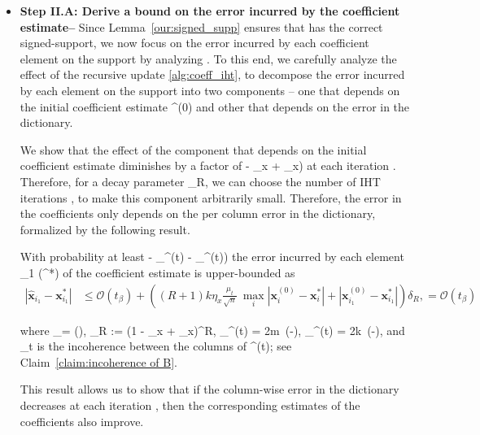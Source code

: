 \documentclass{article}
\newcommand{\HT}{{\c{T}}}
\newcommand{\supp}{{\rm supp}}
\def\[#1\]{{$#1$}}
\def\b#1{{\mathbf{#1}}}
\def\c#1{{\mathcal{#1}}}
\begin{document}
\begin{itemize}
\item\textbf{Step II.A: Derive a bound on the error incurred by the coefficient estimate-- }\label{Step II.A}
Since Lemma~\ref{our:signed_supp} ensures that \[\hat{\b{x}}\] has the correct signed-support, we now focus on the error incurred by each coefficient element on the support by analyzing \[\hat{\b{x}}\]. To this end, we carefully analyze the effect of the recursive update \eqref{alg:coeff_iht}, to decompose the error incurred by each element on the support into two components -- one  that depends on the initial coefficient estimate \[\b{x}^{(0)}\] and other that depends on the error in the dictionary. 

We show that the effect of the component that depends on the initial coefficient estimate diminishes by a factor of \[(1 - \eta_{x} + \eta_x)\] at each iteration \[r\]. Therefore, for a decay parameter \[\delta_R\], we can choose the number of IHT iterations \[R\], to make this component arbitrarily small. Therefore, the error in the coefficients only depends on the per column error in the dictionary, formalized by the following result.

 \begin{lemma}\label{iht:x_R_error}
 	With probability at least \[(1 - \delta_{\beta}^{(t)} - \delta_{\HT}^{(t)})\] the error incurred by each element \[i_1 \in \supp(\b{x}^*)\] of the coefficient estimate is upper-bounded as
 	\begin{align*}
 	
 	
 	|\hat{\b{x}}_{i_1} - \b{x}_{i_1}^*|
 
 	&\leq    \mathcal{O}(t_\beta) + \left({(R + 1)}k \eta_x\tfrac{\mu_t}{\sqrt{n}}~\underset{i}{\max}|\b{x}_{i}^{(0)} - \b{x}_{i}^*| + |\b{x}_{i_1}^{(0)} - \b{x}_{i_1}^*| \right)\delta_{R},
 	
 	=  \mathcal{O}(t_\beta)
 	\end{align*}
 	
 	where \[t_\beta = ()\], \[\delta_{R} := (1 - \eta_{x} + \eta_x)^{R}\], \[\delta_{\HT}^{(t)} = 2m~{\exp}({-})\], \[\delta_{\beta}^{(t)} = 2k~{\exp}(-)\], and \[\mu_t\] is the incoherence between the columns of \[\b{A}^{(t)}\]; see Claim~\ref{claim:incoherence of B}.
 \end{lemma}
This result allows us to show that if the column-wise error in the dictionary decreases at each iteration \[t\], then the corresponding estimates of the coefficients also improve.


\end{itemize}
\end{document}
